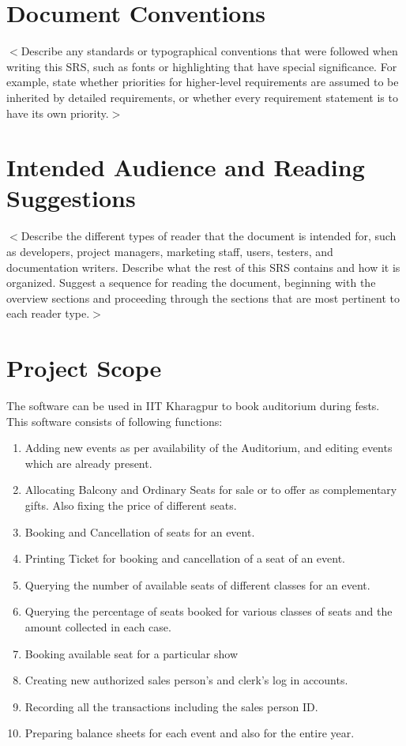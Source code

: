 \documentclass{scrreprt}
\begin{document}
\section{Document Conventions}
$<$Describe any standards or typographical conventions that were followed when 
writing this SRS, such as fonts or highlighting that have special significance.  
For example, state whether priorities  for higher-level requirements are assumed 
to be inherited by detailed requirements, or whether every requirement statement 
is to have its own priority.$>$

\section{Intended Audience and Reading Suggestions}
$<$Describe the different types of reader that the document is intended for, 
such as developers, project managers, marketing staff, users, testers, and 
documentation writers. Describe what the rest of this SRS contains and how it is 
organized. Suggest a sequence for reading the document, beginning with the 
overview sections and proceeding through the sections that are most pertinent to 
each reader type.$>$

\section{Project Scope}
The software can be used in IIT Kharagpur to book auditorium during fests. This software consists of following functions:
\begin{enumerate}
	\item Adding new events as per availability of the Auditorium, and editing events which are already present.
	\item Allocating Balcony and Ordinary Seats for sale or to offer as complementary gifts. Also fixing the price of different seats.
	\item Booking and Cancellation of seats for an event.
	\item Printing Ticket for booking and cancellation of a seat of an event.
	\item Querying the number of available seats of different classes for an event.
	\item Querying the percentage of seats booked for various classes of seats and the amount collected in each case.
	\item Booking available seat for a particular show
	\item Creating new authorized sales person’s and clerk’s log in accounts.
	\item Recording all the transactions including the sales person ID.
	\item Preparing balance sheets for each event and also for the entire year.
\end{enumerate}
\end{document}
